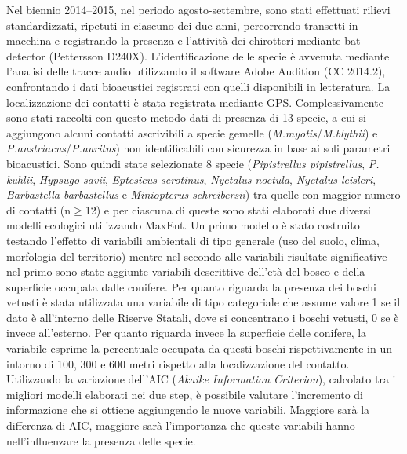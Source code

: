 {Nel biennio 2014--2015, nel periodo agosto-settembre, sono stati effettuati rilievi standardizzati, ripetuti in ciascuno dei due anni, percorrendo transetti in macchina e registrando la presenza e l'attività dei chirotteri mediante bat-detector (Pettersson D240X). L'identificazione delle specie è avvenuta mediante l'analisi delle tracce audio utilizzando il software Adobe Audition (CC 2014.2), confrontando i dati bioacustici registrati con quelli disponibili in letteratura. La localizzazione dei contatti è stata registrata mediante GPS. Complessivamente sono stati raccolti con questo metodo dati di presenza di 13 specie, a cui si aggiungono alcuni contatti ascrivibili a specie gemelle (\emph{M.myotis}/\emph{M.blythii}) e \emph{P.austriacus}/\emph{P.auritus}) non identificabili con sicurezza in base ai soli parametri bioacustici. Sono quindi state selezionate 8 specie (\emph{Pipistrellus pipistrellus}, \emph{P. kuhlii}, \emph{Hypsugo savii}, \emph{Eptesicus serotinus}, \emph{Nyctalus noctula}, \emph{Nyctalus leisleri}, \emph{Barbastella barbastellus} e \emph{Miniopterus schreibersii}) tra quelle con maggior numero di contatti (n$\geq$12) e per ciascuna di queste sono stati elaborati due diversi modelli ecologici utilizzando MaxEnt. Un primo modello è stato costruito testando l'effetto di variabili ambientali di tipo generale (uso del suolo, clima, morfologia del territorio) mentre nel secondo alle variabili risultate significative nel primo sono state aggiunte variabili descrittive dell'età del bosco e della superficie occupata dalle conifere. Per quanto riguarda la presenza dei boschi vetusti è stata utilizzata una variabile di tipo categoriale che assume valore 1 se il dato è all'interno delle Riserve Statali, dove si concentrano i boschi vetusti, 0 se è invece all'esterno. Per quanto riguarda invece la superficie delle conifere, la variabile esprime la percentuale occupata da questi boschi rispettivamente in un intorno di 100, 300 e 600 metri rispetto alla localizzazione del contatto. Utilizzando la variazione dell'AIC (\textit{Akaike Information Criterion}), calcolato tra i migliori modelli elaborati nei due step, è possibile valutare l'incremento di informazione che si ottiene aggiungendo le nuove variabili. Maggiore sarà la differenza di AIC, maggiore sarà l'importanza che queste variabili hanno nell'influenzare la presenza delle specie.

}
